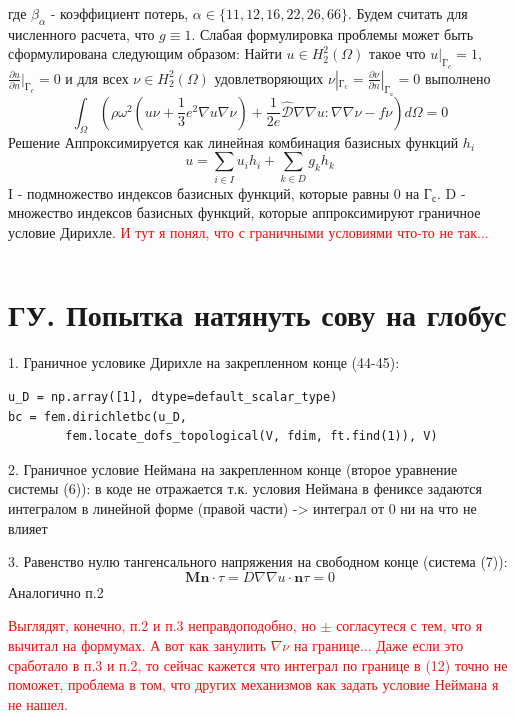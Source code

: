 \documentclass[a4paper,12pt]{article}
\begin{document}
где $\beta_\alpha$ - коэффициент потерь, $\alpha \in  \{11,12,16,22,26,66\}$.
Будем считать для численного расчета, что $ g \equiv 1$.
Слабая формулировка проблемы может быть сформулирована следующим образом: Найти $u \in H^2_2(\Omega)$ такое что $u|_{\text{Г}_c} = 1$, $\frac{\partial u}{\partial n }|_{\text{Г}_c} = 0$ и для всех $\nu \in H^2_2(\Omega)$ удовлетворяющих $\nu|_{\text{Г}_\text{c}}  = \frac{\partial \nu}{\partial n}|_{\text{Г}_\text{с}}= 0$ выполнено
\begin{equation}
\int_\Omega (\rho \omega^2 (u \nu + \frac{1}{3}e^2 \nabla u \nabla \nu) + \frac{1}{2e}\hat{\mathcal{D}} \nabla \nabla u : \nabla \nabla \nu -f\nu)d\Omega = 0    
\end{equation} 
Решение Аппроксимируется как линейная комбинация базисных функций $h_i$
\begin{equation}
    u = \sum_{i \in I}u_ih_i + \sum_{k \in D}g_kh_k
\end{equation}
I - подмножество индексов базисных функций, которые равны 0 на $\text{Г}_\text{с}$. D - множество индексов базисных функций, которые аппроксимируют граничное условие Дирихле. \textcolor{red}{ И тут я понял, что с граничными условиями что-то не так...}

\begin{lstlisting}

\end{lstlisting}

\section{ГУ. Попытка натянуть сову на глобус}
1. Граничное условике Дирихле на закрепленном конце (44-45):
\begin{lstlisting}
u_D = np.array([1], dtype=default_scalar_type)
bc = fem.dirichletbc(u_D, 
        fem.locate_dofs_topological(V, fdim, ft.find(1)), V)
\end{lstlisting}
2. Граничное условие Неймана на закрепленном конце (второе уравнение системы (6)): в коде не отражается т.к. условия Неймана в фениксе задаются интегралом в линейной форме (правой части) -> интеграл от 0 ни на что не влияет

\par
3. Равенство нулю тангенсального напряжения на свободном конце (система (7)):
\begin{equation}
    \textbf{M} \textbf{n} \cdot \tau = D \nabla \nabla u \cdot \textbf{n} \tau  = 0 
\end{equation}
Аналогично п.2
\par
\textcolor{red}{Выглядят, конечно, п.2 и п.3 неправдоподобно, но $\pm$ согласутеся с тем, что я вычитал на формумах. А вот как занулить $\nabla \nu$ на границе... Даже если это сработало в п.3 и п.2, то сейчас кажется что интеграл по границе в (12) точно не поможет, проблема в том, что других механизмов как задать условие Неймана я не нашел. }
\end{document}
